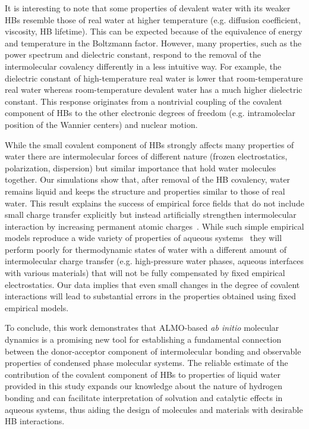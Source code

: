 \documentclass[aps,prl,reprint,amsmath,amssymb]{revtex4-1}
\begin{document}
It is interesting to note that some properties of devalent water with its weaker HBs resemble those of real water at higher temperature (e.g. diffusion coefficient, viscosity, HB lifetime). 
This can be expected because of the equivalence of energy and temperature in the Boltzmann factor. However, many properties, such as the power spectrum and dielectric constant, respond to the removal of the intermolecular covalency differently in a less intuitive way. 
For example, the dielectric constant of high-temperature real water is lower that room-temperature real water whereas room-temperature devalent water has a much higher dielectric constant. 
This response originates from a nontrivial coupling of the covalent component of HBs to the other electronic degrees of freedom (e.g. intramoleclar position of the Wannier centers) and nuclear motion.

While the small covalent component of HBs strongly affects many properties of water there are intermolecular forces of different nature (frozen electrostatics, polarization, dispersion) but similar importance that hold water molecules together. 
Our simulations show that, after removal of the HB covalency, water remains liquid and keeps the structure and properties similar to those of real water. 
This result explains the success of empirical force fields that do not include small charge transfer explicitly but instead artificially strengthen intermolecular interaction by increasing permanent atomic charges~\cite{rick2016polarizable}. 
While such simple empirical models reproduce a wide variety of properties of aqueous systems~\cite{vega2011simulating} they will perform poorly for thermodynamic states of water with a different amount of intermolecular charge transfer (e.g. high-pressure water phases, aqueous interfaces with various materials) that will not be fully compensated by fixed empirical electrostatics.
Our data implies that even small changes in the degree of covalent interactions will lead to substantial errors in the properties obtained using fixed empirical models.

To conclude, this work demonstrates that ALMO-based \emph{ab initio} molecular dynamics is a promising new tool for establishing a fundamental connection between the donor-acceptor component of intermolecular bonding and observable properties of condensed phase molecular systems. 
The reliable estimate of the contribution of the covalent component of HBs to properties of liquid water provided in this study expands our knowledge about the nature of hydrogen bonding and can facilitate interpretation of solvation and catalytic effects in aqueous systems, thus aiding the design of molecules and materials with desirable HB interactions. 
 
\end{document}
